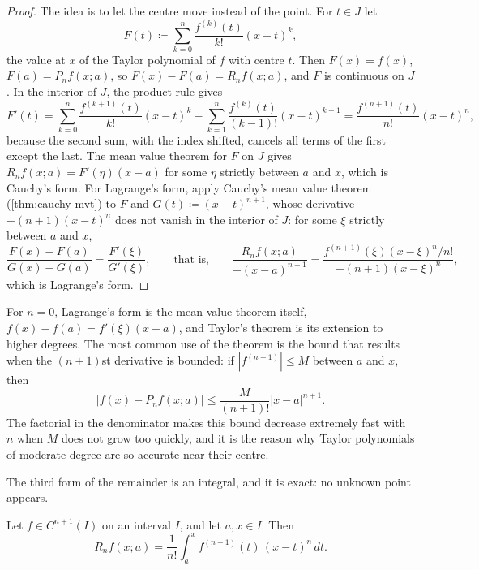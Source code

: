 \begin{proof}
The idea is to let the centre move instead of the point. For $t\in J$ let
\[
F(t)\coloneqq\sum_{k=0}^n\frac{f^{(k)}(t)}{k!}(x-t)^k ,
\]
the value at $x$ of the Taylor polynomial of $f$ with centre $t$. Then $F(x)=f(x)$, $F(a)=P_nf(x;a)$, so $F(x)-F(a)=R_nf(x;a)$, and $F$ is continuous on $J$. In the interior of $J$, the product rule gives
\[
F'(t)=\sum_{k=0}^n\frac{f^{(k+1)}(t)}{k!}(x-t)^k-\sum_{k=1}^n\frac{f^{(k)}(t)}{(k-1)!}(x-t)^{k-1}=\frac{f^{(n+1)}(t)}{n!}(x-t)^n ,
\]
because the second sum, with the index shifted, cancels all terms of the first except the last. The mean value theorem for $F$ on $J$ gives $R_nf(x;a)=F'(\eta)(x-a)$ for some $\eta$ strictly between $a$ and $x$, which is Cauchy's form. For Lagrange's form, apply Cauchy's mean value theorem (\cref{thm:cauchy-mvt}) to $F$ and $G(t)\coloneqq(x-t)^{n+1}$, whose derivative $-(n+1)(x-t)^n$ does not vanish in the interior of $J$: for some $\xi$ strictly between $a$ and $x$,
\[
\frac{F(x)-F(a)}{G(x)-G(a)}=\frac{F'(\xi)}{G'(\xi)},\qquad\text{that is,}\qquad\frac{R_nf(x;a)}{-(x-a)^{n+1}}=\frac{f^{(n+1)}(\xi)(x-\xi)^n/n!}{-(n+1)(x-\xi)^n} ,
\]
which is Lagrange's form.
\end{proof}

For $n=0$, Lagrange's form is the mean value theorem itself, $f(x)-f(a)=f'(\xi)(x-a)$, and Taylor's theorem is its extension to higher degrees. The most common use of the theorem is the bound that results when the $(n+1)$st derivative is bounded: if $|f^{(n+1)}|\le M$ between $a$ and $x$, then
\begin{equation}
\bigl|f(x)-P_nf(x;a)\bigr|\le\frac{M}{(n+1)!}|x-a|^{n+1}.
\label{eq:taylor-bound}
\end{equation}
The factorial in the denominator makes this bound decrease extremely fast with $n$ when $M$ does not grow too quickly, and it is the reason why Taylor polynomials of moderate degree are so accurate near their centre.

The third form of the remainder is an integral, and it is exact: no unknown point appears.

\begin{theorem}
\label{thm:taylor-integral}
Let $f\in C^{n+1}(I)$ on an interval $I$, and let $a,x\in I$. Then
\[
R_nf(x;a)=\frac1{n!}\int_a^xf^{(n+1)}(t)\,(x-t)^n\,dt .
\]
\end{theorem}


